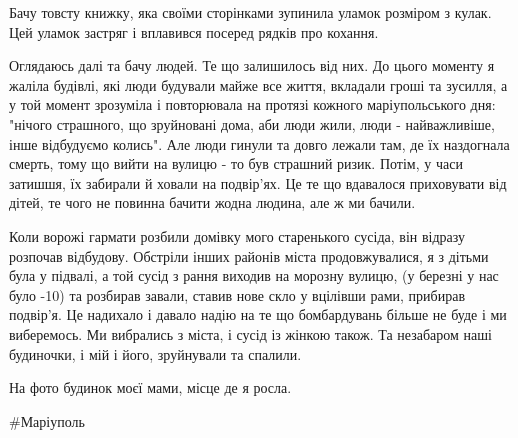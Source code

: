 Бачу товсту книжку, яка своїми сторінками зупинила уламок розміром з кулак. Цей
уламок застряг і вплавився посеред рядків про кохання. 

Оглядаюсь далі та бачу людей. Те що залишилось від них. До цього моменту я
жаліла будівлі, які люди будували майже все життя, вкладали гроші та зусилля, а
у той момент зрозуміла і повторювала на протязі  кожного маріупольського дня:
"нічого страшного, що зруйновані дома, аби люди жили, люди - найважливіше, інше
відбудуємо колись".  Але люди гинули та довго лежали там, де їх наздогнала
смерть, тому що вийти на вулицю - то був страшний ризик. Потім, у часи затишшя,
їх забирали й ховали на подвір'ях. Це те що вдавалося приховувати від дітей, те
чого не повинна бачити жодна людина, але ж ми бачили.

Коли ворожі гармати розбили домівку мого старенького сусіда, він відразу
розпочав відбудову. Обстріли інших районів міста продовжувалися, я з дітьми
була у підвалі, а той сусід з рання виходив на морозну вулицю, (у березні у нас
було -10) та розбирав завали, ставив нове скло у вцілівши рами, прибирав
подвір'я. Це надихало і давало надію на те що бомбардувань більше не буде і ми
виберемось. Ми вибрались з міста, і сусід із жінкою також. Та незабаром наші
будиночки, і мій і його, зруйнували та спалили.

На фото будинок моєї мами, місце де я росла.

\#Маріуполь
